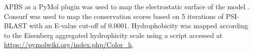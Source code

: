 

APBS as a PyMol plugin was used to map the electrostatic surface of the model \cite{Baker2001}.
Consurf \cite{Ashkenazy2010} was used to map the conservation scores based on 5 iterations of PSI-BLAST \cite{Altschul1997} with an E-value cut-off of 0.0001.
Hydrophobicity was mapped according to the Eisenberg aggregated hydrophicity scale \cite{Eisenberg1984} using a script accessed at \url{https://pymolwiki.org/index.php/Color_h}.

